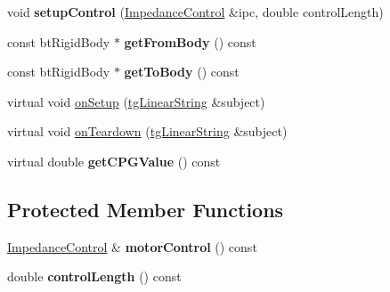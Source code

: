 \begin{DoxyCompactItemize}
\item 
\hypertarget{classtg_c_p_g_string_control_a868e042db3108d0dbf8597cc9f86597c}{void {\bfseries setup\-Control} (\hyperlink{class_impedance_control}{Impedance\-Control} \&ipc, double control\-Length)}\label{classtg_c_p_g_string_control_a868e042db3108d0dbf8597cc9f86597c}

\item 
\hypertarget{classtg_c_p_g_string_control_a8e250898a3cac70653979f9f541d540a}{const bt\-Rigid\-Body $\ast$ {\bfseries get\-From\-Body} () const }\label{classtg_c_p_g_string_control_a8e250898a3cac70653979f9f541d540a}

\item 
\hypertarget{classtg_c_p_g_string_control_aa56a7a6547fad1b945f899cfc02588b9}{const bt\-Rigid\-Body $\ast$ {\bfseries get\-To\-Body} () const }\label{classtg_c_p_g_string_control_aa56a7a6547fad1b945f899cfc02588b9}

\item 
virtual void \hyperlink{classtg_observer_ae7b2de87bd4a6e786bc16f1b801c36a6}{on\-Setup} (\hyperlink{classtg_linear_string}{tg\-Linear\-String} \&subject)
\item 
virtual void \hyperlink{classtg_observer_a1663edb3732e5ffb7bbe6bfb4ade88b8}{on\-Teardown} (\hyperlink{classtg_linear_string}{tg\-Linear\-String} \&subject)
\item 
\hypertarget{classtg_base_c_p_g_node_ad1d345d3ae51675eb18ae7de7e6338b4}{virtual double {\bfseries get\-C\-P\-G\-Value} () const }\label{classtg_base_c_p_g_node_ad1d345d3ae51675eb18ae7de7e6338b4}

\end{DoxyCompactItemize}
\subsection*{Protected Member Functions}
\begin{DoxyCompactItemize}
\item 
\hypertarget{classtg_base_c_p_g_node_ab23a06a31ca175c2ca7e867db10a6db9}{\hyperlink{class_impedance_control}{Impedance\-Control} \& {\bfseries motor\-Control} () const }\label{classtg_base_c_p_g_node_ab23a06a31ca175c2ca7e867db10a6db9}

\item 
\hypertarget{classtg_base_c_p_g_node_a4e868b27cfcd8b7115ba993c81562bd6}{double {\bfseries control\-Length} () const }\label{classtg_base_c_p_g_node_a4e868b27cfcd8b7115ba993c81562bd6}

\end{DoxyCompactItemize}
